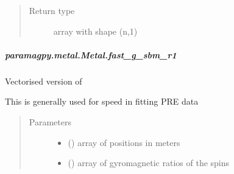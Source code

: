 \documentclass[a4paper,10pt,english,openany,oneside]{sphinxmanual}
\begin{document}
\begin{fulllineitems}
\begin{fulllineitems}
\begin{fulllineitems}
\begin{quote}
\begin{description}
\item[{Return type}] \leavevmode
array with shape (n,1)

\end{description}\end{quote}

\end{fulllineitems}



\subparagraph{paramagpy.metal.Metal.fast\_g\_sbm\_r1}
\label{\detokenize{reference/generated/paramagpy.metal.Metal.fast_g_sbm_r1:paramagpy-metal-metal-fast-g-sbm-r1}}\label{\detokenize{reference/generated/paramagpy.metal.Metal.fast_g_sbm_r1::doc}}

\begin{fulllineitems}
\label{\detokenize{reference/generated/paramagpy.metal.Metal.fast_g_sbm_r1:paramagpy.metal.Metal.fast_g_sbm_r1}}
Vectorised version of {\hyperref[\detokenize{reference/generated/paramagpy.metal.Metal.g_sbm_r1:paramagpy.metal.Metal.g_sbm_r1}]{}}

This is generally used for speed in fitting PRE data
\begin{quote}\begin{description}
\item[{Parameters}] \leavevmode\begin{itemize}
\item {} 
 (\sphinxstyleliteralemphasis{\sphinxupquote{ (}}\sphinxstyleliteralemphasis{\sphinxupquote{,}}\sphinxstyleliteralemphasis{\sphinxupquote{)}}) \textendash{} array of positions in meters

\item {} 
 (\sphinxstyleliteralemphasis{\sphinxupquote{ (}}\sphinxstyleliteralemphasis{\sphinxupquote{,}}\sphinxstyleliteralemphasis{\sphinxupquote{)}}) \textendash{} array of gyromagnetic ratios of the spins


\end{itemize}
\end{description}
\end{quote}
\end{fulllineitems}
\end{fulllineitems}
\end{fulllineitems}
\end{document}
